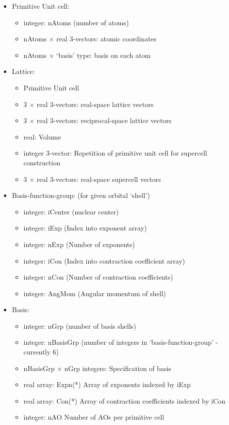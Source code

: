 \documentclass{report}
\begin{document}
\begin{itemize}
\item Primitive Unit cell:
\begin{itemize}
\item integer: nAtoms (number of atoms)
\item nAtoms $\times$ real 3-vectors: atomic coordinates
\item nAtoms $\times$ `basis' type: basis on each atom
\end{itemize}

\item Lattice:
\begin{itemize}
\item Primitive Unit cell
\item 3 $\times$ real 3-vectors: real-space lattice vectors
\item 3 $\times$ real 3-vectors: reciprocal-space lattice vectors
\item real: Volume
\item integer 3-vector: Repetition of primitive unit cell for supercell construction
\item 3 $\times$ real 3-vectors: real-space supercell vectors
\end{itemize}

\item Basis-function-group: (for given orbital `shell')
\begin{itemize}
\item integer: iCenter  (nuclear center)
\item integer: iExp     (Index into exponent array)
\item integer: nExp     (Number of exponents)
\item integer: iCon     (Index into contraction coefficient array)
\item integer: nCon     (Number of contraction coefficients)
\item integer: AngMom   (Angular momentum of shell)
\end{itemize}

\item Basis:
\begin{itemize}
\item integer: nGrp (number of basis shells)
\item integer: nBasisGrp (number of integers in `basis-function-group' - currently 6)
\item nBasisGrp $\times$ nGrp integers: Specification of basis
\item real array: Expn(*) Array of exponents indexed by iExp
\item real array: Con(*) Array of contraction coefficients indexed by iCon
\item integer: nAO Number of AOs per primitive cell
\end{itemize}
\end{itemize}
    
\end{document}
